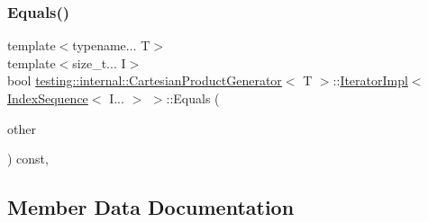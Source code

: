\subsubsection{\texorpdfstring{Equals()}{Equals()}\hspace{0.1cm}{\footnotesize\ttfamily [2/2]}}
{\footnotesize\ttfamily template$<$typename... T$>$ \\
template$<$size\+\_\+t... I$>$ \\
bool \mbox{\hyperlink{classtesting_1_1internal_1_1_cartesian_product_generator}{testing\+::internal\+::\+Cartesian\+Product\+Generator}}$<$ T $>$\+::\mbox{\hyperlink{classtesting_1_1internal_1_1_cartesian_product_generator_1_1_iterator_impl}{Iterator\+Impl}}$<$ \mbox{\hyperlink{structtesting_1_1internal_1_1_index_sequence}{Index\+Sequence}}$<$ I... $>$ $>$\+::Equals (\begin{DoxyParamCaption}\item[{const \mbox{\hyperlink{classtesting_1_1internal_1_1_param_iterator_interface}{Param\+Iterator\+Interface}}$<$ \mbox{\hyperlink{classtesting_1_1internal_1_1_cartesian_product_generator_af27131157a9347f0c82420ca081ee7dd}{Param\+Type}} $>$ \&}]{other }\end{DoxyParamCaption}) const\hspace{0.3cm}{\ttfamily [inline]}, {\ttfamily [override]}}



\subsection{Member Data Documentation}
\mbox{\label{classtesting_1_1internal_1_1_cartesian_product_generator_1_1_iterator_impl_3_01_index_sequence_3_01_i_8_8_8_01_4_01_4_a5dfc17ca0cefaf5176f1e63c8fb5fd48}} 
